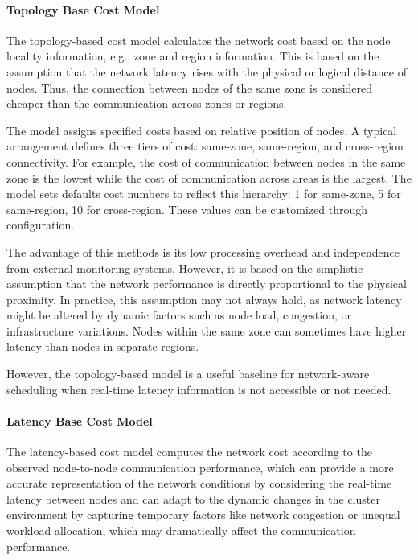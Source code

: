 \paragraph{Topology Base Cost Model}
\label{sec:netaware_topologycostmodel}
The topology-based cost model calculates the network cost based on the node locality information, e.g., zone and region information. This is based on the assumption that the network latency rises with the physical or logical distance of nodes. Thus, the connection between nodes of the same zone is considered cheaper than the communication across zones or regions.

The model assigns specified costs based on relative position of nodes. A typical arrangement defines three tiers of cost: same-zone, same-region, and cross-region connectivity. For example, the cost of communication between nodes in the same zone is the lowest while the cost of communication across areas is the largest. The model sets defaults cost numbers to reflect this hierarchy: 1 for same-zone, 5 for same-region, 10 for cross-region. These values can be customized through configuration.

The advantage of this methods is its low processing overhead and independence from external monitoring systems. However, it is based on the simplistic assumption that the network performance is directly proportional to the physical proximity. In practice, this assumption may not always hold, as network latency might be altered by dynamic factors such as node load, congestion, or infrastructure variations. Nodes within the same zone can sometimes have higher latency than nodes in separate regions.

However, the topology-based model is a useful baseline for network-aware scheduling when real-time latency information is not accessible or not needed.

\paragraph{Latency Base Cost Model}
\label{sec:netaware_latencycostmodel}

The latency-based cost model computes the network cost according to the observed node-to-node communication performance, which can provide a more accurate representation of the network conditions by considering the real-time latency between nodes and can adapt to the dynamic changes in the cluster environment by capturing temporary factors like network congestion or unequal workload allocation, which may dramatically affect the communication performance.

